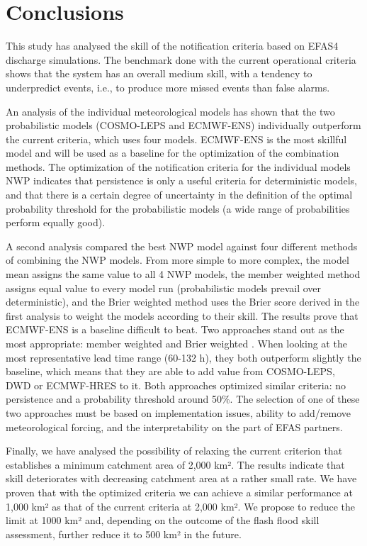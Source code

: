 \documentclass[preprint,12pt]{elsarticle}
\begin{document}
\section{Conclusions}
\label{sec:conclusions}

This study has analysed the skill of the notification criteria based on EFAS4 discharge simulations. The benchmark done with the current operational criteria shows that the system has an overall medium skill, with a tendency to underpredict events, i.e., to produce more missed events than false alarms.

An analysis of the individual meteorological models has shown that the two probabilistic models (COSMO-LEPS and ECMWF-ENS) individually outperform the current criteria, which uses four models. ECMWF-ENS is the most skillful model and will be used as a baseline for the optimization of the combination methods. The optimization of the notification criteria for the individual models NWP indicates that persistence is only a useful criteria for deterministic models, and that there is a certain degree of uncertainty in the definition of the optimal probability threshold for the probabilistic models (a wide range of probabilities perform equally good).

A second analysis compared the best NWP model against four different methods of combining the NWP models. From more simple to more complex, the model mean assigns the same value to all 4 NWP models, the member weighted method assigns equal value to every model run (probabilistic models prevail over deterministic), and the Brier weighted method uses the Brier score derived in the first analysis to weight the models according to their skill. The results prove that ECMWF-ENS is a baseline difficult to beat. Two approaches stand out as the most appropriate: member weighted  and Brier weighted . When looking at the most representative lead time range (60-132 h), they both outperform slightly the baseline, which means that they are able to add value from COSMO-LEPS, DWD or ECMWF-HRES to it. Both approaches optimized similar criteria: no persistence and a probability threshold around 50\%. The selection of one of these two approaches must be based on implementation issues, ability to add/remove meteorological forcing, and the interpretability on the part of EFAS partners.

Finally, we have analysed the possibility of relaxing the current criterion that establishes a minimum catchment area of 2,000 km². The results indicate that skill deteriorates with decreasing catchment area at a rather small rate. We have proven that with the optimized criteria we can achieve a similar performance at 1,000 km² as that of the current criteria at 2,000 km². We propose to reduce the limit at 1000 km² and, depending on the outcome of the flash flood skill assessment, further reduce it to 500 km² in the future.
\end{document}
